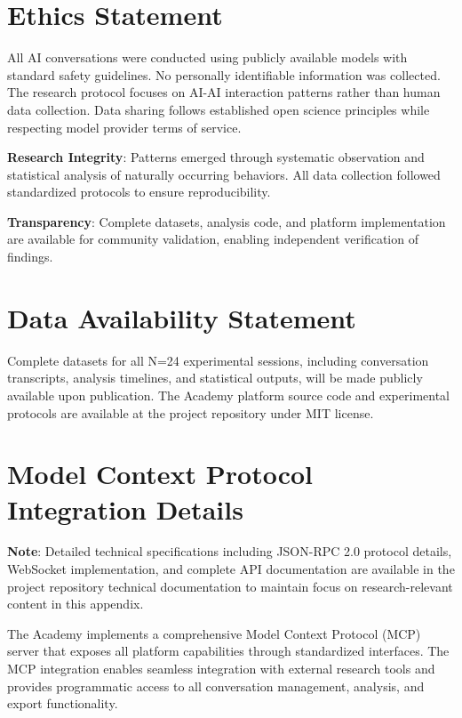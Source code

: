 \documentclass[11pt,letterpaper]{article}
\newcommand{\theacademy}{The Academy}
\newcommand{\exponedataTotalSessionsRaw}{24}
\newcommand{\exponedataTotalSessions}{N=\exponedataTotalSessionsRaw}
\begin{document}
\section*{Ethics Statement}

All AI conversations were conducted using publicly available models with standard safety guidelines. No personally identifiable information was collected. The research protocol focuses on AI-AI interaction patterns rather than human data collection. Data sharing follows established open science principles while respecting model provider terms of service.

\textbf{Research Integrity}: Patterns emerged through systematic observation and statistical analysis of naturally occurring behaviors. All data collection followed standardized protocols to ensure reproducibility.

\textbf{Transparency}: Complete datasets, analysis code, and platform implementation are available for community validation, enabling independent verification of findings.

\section*{Data Availability Statement}

Complete datasets for all \exponedataTotalSessions{} experimental sessions, including conversation transcripts, analysis timelines, and statistical outputs, will be made publicly available upon publication. \theacademy{} platform source code and experimental protocols are available at the project repository under MIT license.




\appendix

\section{Model Context Protocol Integration Details}
\label{app:mcp}

\textbf{Note}: Detailed technical specifications including JSON-RPC 2.0 protocol details, WebSocket implementation, and complete API documentation are available in the project repository technical documentation to maintain focus on research-relevant content in this appendix.

\theacademy{} implements a comprehensive Model Context Protocol (MCP) server that exposes all platform capabilities through standardized interfaces. The MCP integration enables seamless integration with external research tools and provides programmatic access to all conversation management, analysis, and export functionality.
\end{document}
